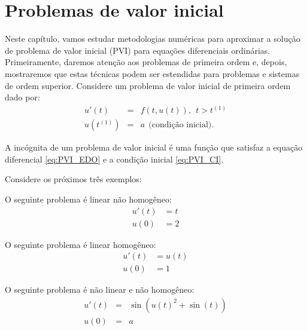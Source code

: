 
%

\chapter{Problemas de valor inicial}
Neste capítulo, vamos estudar metodologias numéricas para aproximar a solução de problema de valor inicial (PVI) para equações diferenciais ordinárias. Primeiramente, daremos atenção aos problemas de primeira ordem e, depois, mostraremos que estas técnicas podem ser estendidas para problemas e sistemas de ordem superior. Considere um problema de valor inicial de primeira ordem dado por:
\begin{subequations}\label{eq:PVI}
\begin{eqnarray}
  u'(t) &=& f(t, u(t)),~~t>t^{(1)}\label{eq:PVI_EDO}\\
  u(t^{(1)}) &=& a ~~ \text{(condição inicial)}.\label{eq:PVI_CI}
\end{eqnarray}
\end{subequations}

A incógnita de um problema de valor inicial é uma função que satisfaz a equação diferencial \eqref{eq:PVI_EDO} e a condição inicial \eqref{eq:PVI_CI}.

Considere os próximos três exemplos:
\begin{ex} O seguinte problema é linear não homogêneo:
\begin{equation}
\begin{split}
    u'(t) &=t\\
   u(0) &= 2
   \end{split}
   \end{equation}
\end{ex}

\begin{ex} O seguinte problema é linear homogêneo:
\begin{eqnarray}
   u'(t) &=u(t)\\
            u(0) &= 1
\end{eqnarray}
\end{ex}

\begin{ex} O seguinte problema é não linear e não homogêneo:
\begin{eqnarray}
   u'(t) &=&\sin(u(t)^2+\sin(t))\\
            u(0) &=& a
\end{eqnarray}
\end{ex}

